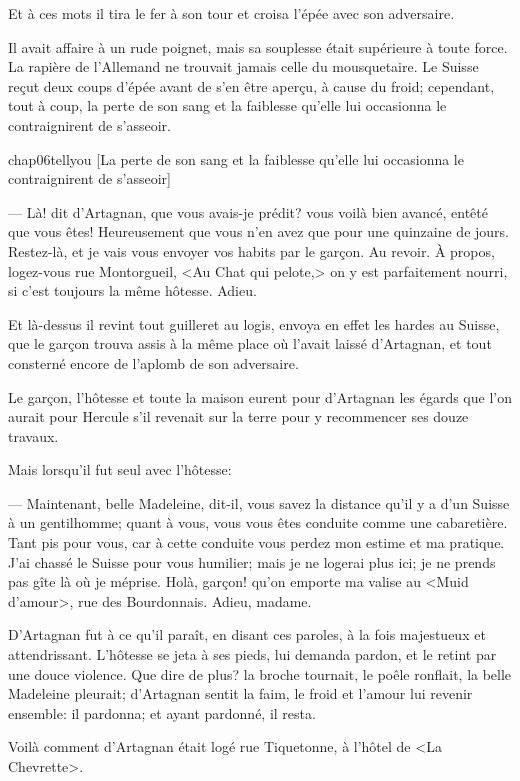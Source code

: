 Et à ces mots il tira le fer à son tour et croisa l'épée avec son adversaire.

Il avait affaire à un rude poignet, mais sa souplesse était supérieure à toute force. La rapière de l'Allemand ne trouvait jamais celle du mousquetaire. Le Suisse reçut deux coups d'épée avant de s'en être aperçu, à cause du froid; cependant, tout à coup, la perte de son sang et la faiblesse qu'elle lui occasionna le contraignirent de s'asseoir.

\begin{bwbigpic}
	[\basicscale] 
	{chap06tellyou}
	[La perte de son sang et la faiblesse qu'elle lui occasionna le contraignirent de s'asseoir]
\end{bwbigpic}

— Là! dit d'Artagnan, que vous avais-je prédit? vous voilà bien avancé, entêté que vous êtes! Heureusement que vous n'en avez que pour une quinzaine de jours. Restez-là, et je vais vous envoyer vos habits par le garçon. Au revoir. À propos, logez-vous rue Montorgueil, <Au Chat qui pelote,> on y est parfaitement nourri, si c'est toujours la même hôtesse. Adieu.

Et là-dessus il revint tout guilleret au logis, envoya en effet les hardes au Suisse, que le garçon trouva assis à la même place où l'avait laissé d'Artagnan, et tout consterné encore de l'aplomb de son adversaire.

Le garçon, l'hôtesse et toute la maison eurent pour d'Artagnan les égards que l'on aurait pour Hercule s'il revenait sur la terre pour y recommencer ses douze travaux.

Mais lorsqu'il fut seul avec l'hôtesse:

— Maintenant, belle Madeleine, dit-il, vous savez la distance qu'il y a d'un Suisse à un gentilhomme; quant à vous, vous vous êtes conduite comme une cabaretière. Tant pis pour vous, car à cette conduite vous perdez mon estime et ma pratique. J'ai chassé le Suisse pour vous humilier; mais je ne logerai plus ici; je ne prends pas gîte là où je méprise. Holà, garçon! qu'on emporte ma valise au <Muid d'amour>, rue des Bourdonnais. Adieu, madame.

D'Artagnan fut à ce qu'il paraît, en disant ces paroles, à la fois majestueux et attendrissant. L'hôtesse se jeta à ses pieds, lui demanda pardon, et le retint par une douce violence. Que dire de plus? la broche tournait, le poêle ronflait, la belle Madeleine pleurait; d'Artagnan sentit la faim, le froid et l'amour lui revenir ensemble: il pardonna; et ayant pardonné, il resta.

Voilà comment d'Artagnan était logé rue Tiquetonne, à l'hôtel de <La Chevrette>.
